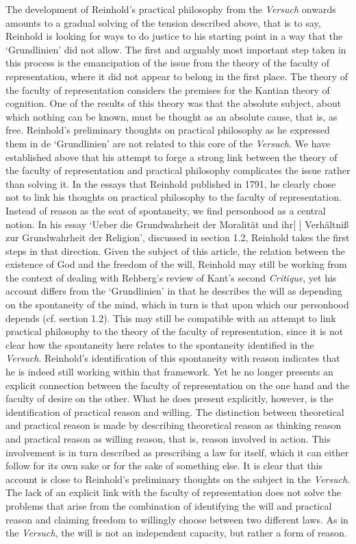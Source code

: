  The development of Reinhold's practical philosophy from the \textit{Versuch }onwards amounts to a gradual solving of the tension described above, that is to say, Reinhold is looking for ways to do justice to his starting point in a way that the `Grundlinien' did not allow. The first and arguably most important step taken in this process is the emancipation of the issue from the theory of the faculty of representation, where it did not appear to belong in the first place. The theory of the faculty of representation considers the premises for the Kantian theory of cognition. One of the results of this theory was that the absolute subject, about which nothing can be known, must be thought as an absolute cause, that is, as free. Reinhold's preliminary thoughts on practical philosophy as he expressed them in de `Grundlinien' are not related to this core of the \textit{Versuch}. We have established above that his attempt to forge a strong link between the theory of the faculty of representation and practical philosophy complicates the issue rather than solving it. In the essays that Reinhold published in 1791, he clearly chose not to link his thoughts on practical philosophy to the faculty of representation. Instead of reason as the seat of spontaneity, we find personhood as a central notion. In his essay `Ueber die Grundwahrheit der Moralit\"{a}t und ihr[ ] Verh\"{a}ltni\ss{} zur Grundwahrheit der Religion', discussed in section 1.2, Reinhold takes the first steps in that direction. Given the subject of this article, the relation between the existence of God and the freedom of the will, Reinhold may still be working from the context of dealing with Rehberg's review of Kant's second \textit{Critique}, yet his account differs from the `Grundlinien' in that he describes the will as depending on the spontaneity of the mind, which in turn is that upon which our personhood depends (cf. section 1.2). This may still be compatible with an attempt to link practical philosophy to the theory of the faculty of representation, since it is not clear how the spontaneity here relates to the spontaneity identified in the \textit{Versuch}. Reinhold's identification of this spontaneity with reason indicates that he is indeed still working within that framework. Yet he no longer presents an explicit connection between the faculty of representation on the one hand and the faculty of desire on the other. What he does present explicitly, however, is the identification of practical reason and willing. The distinction between theoretical and practical reason is made by describing theoretical reason as thinking reason and practical reason as willing reason, that is, reason involved in action. This involvement is in turn described as prescribing a law for itself, which it can either follow for its own sake or for the sake of something else. It is clear that this account is close to Reinhold's preliminary thoughts on the subject in the \textit{Versuch}. The lack of an explicit link with the faculty of representation does not solve the problems that arise from the combination of identifying the will and practical reason and claiming freedom to willingly choose between two different laws. As in the \textit{Versuch}, the will is not an independent capacity, but rather a form of reason. 

